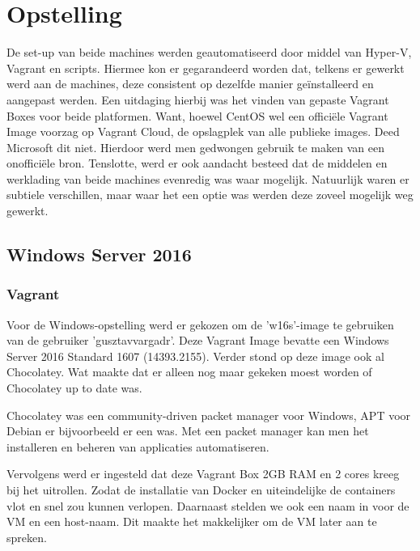 
\chapter{Opstelling}
\label{ch:opstelling}

De set-up van beide machines werden geautomatiseerd door middel van Hyper-V, Vagrant en scripts. Hiermee kon er gegarandeerd worden dat, telkens er gewerkt werd aan de machines, deze consistent op dezelfde manier geïnstalleerd en aangepast werden.
Een uitdaging hierbij was het vinden van gepaste Vagrant Boxes voor beide platformen. Want, hoewel CentOS wel een officiële Vagrant Image voorzag op Vagrant Cloud, de opslagplek van alle publieke images. Deed Microsoft dit niet. Hierdoor werd men gedwongen gebruik te maken van een onofficiële bron.
Tenslotte, werd er ook aandacht besteed dat de middelen en werklading van beide machines evenredig was waar mogelijk. Natuurlijk waren er subtiele verschillen, maar waar het een optie was werden deze zoveel mogelijk weg gewerkt.

\section{Windows Server 2016}


\subsection{Vagrant}
Voor de Windows-opstelling werd er gekozen om de 'w16s'-image te gebruiken van de gebruiker 'gusztavvargadr'. Deze Vagrant Image bevatte een Windows Server 2016 Standard 1607 (14393.2155). Verder stond op deze image ook al Chocolatey. Wat maakte dat er alleen nog maar gekeken moest worden of Chocolatey up to date was.

Chocolatey was een community-driven packet manager voor Windows, APT voor Debian er bijvoorbeeld er een was. Met een packet manager kan men het installeren en beheren van applicaties automatiseren.

Vervolgens werd er ingesteld dat deze Vagrant Box 2GB RAM en 2 cores kreeg bij het uitrollen. Zodat de installatie van Docker en uiteindelijke de containers vlot en snel zou kunnen verlopen. Daarnaast stelden we ook een naam in voor de VM en een host-naam. Dit maakte het makkelijker om de VM later aan te spreken.

